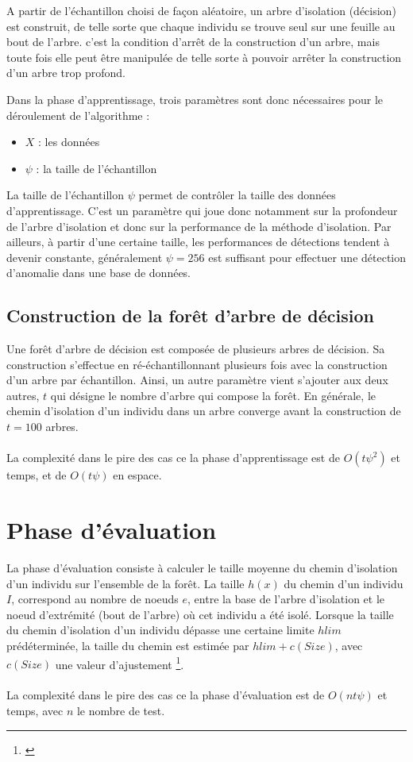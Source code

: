 A partir de l'échantillon choisi de façon aléatoire, un arbre d'isolation (décision) est construit, de telle sorte que chaque individu se trouve seul sur une feuille au bout de l'arbre. c'est la condition d'arrêt de la construction d'un arbre, mais toute fois elle peut être manipulée de telle sorte à pouvoir arrêter la construction d'un arbre trop profond.

Dans la phase d'apprentissage, trois paramètres sont donc nécessaires pour le déroulement de l'algorithme : 

\begin{itemize}
    \item $X$ : les données
    \item $\psi$ : la taille de l'échantillon
\end{itemize}

La taille de l'échantillon $\psi$ permet de contrôler la taille des données d'apprentissage. C'est un paramètre qui joue donc notamment sur la profondeur de l'arbre d'isolation et donc sur la performance de la méthode d'isolation. Par ailleurs, à partir d'une certaine taille, les performances de détections tendent à devenir constante, généralement $\psi=256$ est suffisant pour effectuer une détection d'anomalie dans une base de données.

\subsection*{Construction de la forêt d'arbre de décision}
Une forêt d'arbre de décision est composée de plusieurs arbres de décision. Sa construction s'effectue en ré-échantillonnant plusieurs fois avec la construction d'un arbre par échantillon. Ainsi, un autre paramètre vient s'ajouter aux deux autres, $t$ qui désigne le nombre d'arbre qui compose la forêt. En générale, le chemin d'isolation d'un individu dans un arbre converge avant la construction de $t=100$ arbres.
\\
\\
La complexité dans le pire des cas ce la phase d'apprentissage est de $O(t\psi^2)$ et temps, et de $O(t\psi)$ en espace.

\section{Phase d'évaluation}
La phase d'évaluation consiste à calculer le taille moyenne du chemin d'isolation d'un individu sur l'ensemble de la forêt.
La taille $h(x)$ du chemin d'un individu $I$, correspond au nombre de noeuds $e$, entre la base de l'arbre d'isolation et le noeud d'extrémité (bout de l'arbre) où cet individu a été isolé. 
Lorsque la taille du chemin d'isolation d'un individu dépasse une certaine limite $hlim$ prédéterminée, la taille du chemin est estimée par $hlim+c(Size)$, avec $c(Size)$ une valeur d'ajustement \footnote{\cite{Liu2012}}.
\\
\\
La complexité dans le pire des cas ce la phase d'évaluation est de $O(nt\psi)$ et temps, avec $n$ le nombre de test.

